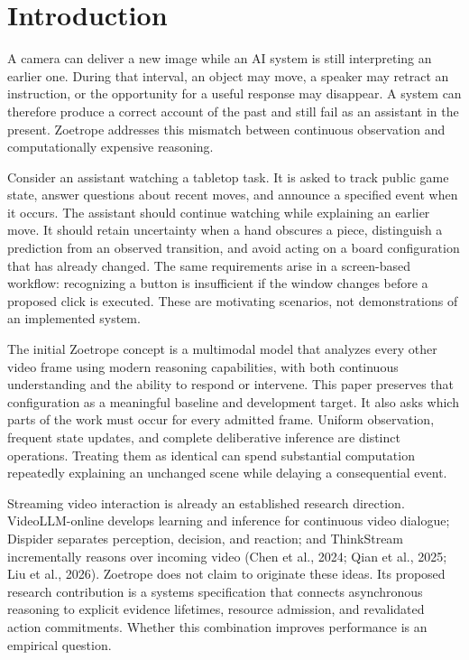 \documentclass[11pt,letterpaper]{article}
\begin{document}
\section{Introduction}
A camera can deliver a new image while an AI system is still interpreting an earlier one. During that interval, an object may move, a speaker may retract an instruction, or the opportunity for a useful response may disappear. A system can therefore produce a correct account of the past and still fail as an assistant in the present. Zoetrope addresses this mismatch between continuous observation and computationally expensive reasoning.

Consider an assistant watching a tabletop task. It is asked to track public game state, answer questions about recent moves, and announce a specified event when it occurs. The assistant should continue watching while explaining an earlier move. It should retain uncertainty when a hand obscures a piece, distinguish a prediction from an observed transition, and avoid acting on a board configuration that has already changed. The same requirements arise in a screen-based workflow: recognizing a button is insufficient if the window changes before a proposed click is executed. These are motivating scenarios, not demonstrations of an implemented system.

The initial Zoetrope concept is a multimodal model that analyzes every other video frame using modern reasoning capabilities, with both continuous understanding and the ability to respond or intervene. This paper preserves that configuration as a meaningful baseline and development target. It also asks which parts of the work must occur for every admitted frame. Uniform observation, frequent state updates, and complete deliberative inference are distinct operations. Treating them as identical can spend substantial computation repeatedly explaining an unchanged scene while delaying a consequential event.

Streaming video interaction is already an established research direction. VideoLLM-online develops learning and inference for continuous video dialogue; Dispider separates perception, decision, and reaction; and ThinkStream incrementally reasons over incoming video (Chen et al., 2024; Qian et al., 2025; Liu et al., 2026). Zoetrope does not claim to originate these ideas. Its proposed research contribution is a systems specification that connects asynchronous reasoning to explicit evidence lifetimes, resource admission, and revalidated action commitments. Whether this combination improves performance is an empirical question.
\end{document}
